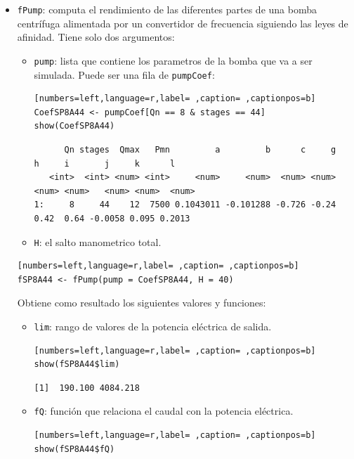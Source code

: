 \begin{itemize}
\item \texttt{fPump}: computa el rendimiento de las diferentes partes de una bomba centrífuga alimentada por un convertidor de frecuencia siguiendo las leyes de afinidad. Tiene solo dos argumentos:
\begin{itemize}
\item \texttt{pump}: lista que contiene los parametros de la bomba que va a ser simulada. Puede ser una fila de \texttt{pumpCoef}:
\begin{lstlisting}[numbers=left,language=r,label= ,caption= ,captionpos=b]
CoefSP8A44 <- pumpCoef[Qn == 8 & stages == 44]
show(CoefSP8A44)
\end{lstlisting}

\begin{verbatim}
      Qn stages  Qmax   Pmn         a         b      c     g     h     i       j     k      l
   <int>  <int> <num> <int>     <num>     <num>  <num> <num> <num> <num>   <num> <num>  <num>
1:     8     44    12  7500 0.1043011 -0.101288 -0.726 -0.24  0.42  0.64 -0.0058 0.095 0.2013
\end{verbatim}

\item \texttt{H}: el salto manometrico total.
\end{itemize}
\begin{lstlisting}[numbers=left,language=r,label= ,caption= ,captionpos=b]
fSP8A44 <- fPump(pump = CoefSP8A44, H = 40)
\end{lstlisting}

Obtiene como resultado los siguientes valores y funciones:
\begin{itemize}
\item \texttt{lim}: rango de valores de la potencia eléctrica de salida.
\begin{lstlisting}[numbers=left,language=r,label= ,caption= ,captionpos=b]
show(fSP8A44$lim)
\end{lstlisting}

\begin{verbatim}
[1]  190.100 4084.218
\end{verbatim}

\item \texttt{fQ}: función que relaciona el caudal con la potencia eléctrica.
\begin{lstlisting}[numbers=left,language=r,label= ,caption= ,captionpos=b]
show(fSP8A44$fQ)
\end{lstlisting}


\end{itemize}
\end{itemize}
